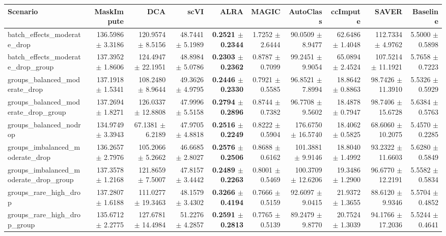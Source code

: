 \begin{tabular}{@{}lrrrrrrrrr@{}}
\toprule
Scenario & MaskImpute & DCA & scVI & ALRA & MAGIC & AutoClass & ccImpute & SAVER & Baseline \\
\midrule
batch\_effects\_moderate\_drop & 136.5986 $\pm$ 3.3186 & 120.9574 $\pm$ 8.5156 & 48.7441 $\pm$ 5.1989 & \textbf{0.2521 $\pm$ 0.2344} & 1.7252 $\pm$ 2.6444 & 90.0509 $\pm$ 8.9477 & 62.6486 $\pm$ 1.4048 & 112.7334 $\pm$ 4.9762 & 5.5000 $\pm$ 0.5898 \\
batch\_effects\_moderate\_drop\_group & 137.3952 $\pm$ 1.8606 & 124.4947 $\pm$ 22.1951 & 48.8984 $\pm$ 5.0786 & \textbf{0.2303 $\pm$ 0.2362} & 0.8787 $\pm$ 0.7099 & 99.2451 $\pm$ 9.9054 & 65.0894 $\pm$ 2.4524 & 107.5214 $\pm$ 11.1921 & 5.7658 $\pm$ 0.7223 \\
groups\_balanced\_moderate\_drop & 137.1918 $\pm$ 1.5341 & 108.2480 $\pm$ 8.9644 & 49.3626 $\pm$ 4.9795 & \textbf{0.2446 $\pm$ 0.2330} & 0.7921 $\pm$ 0.5585 & 96.8521 $\pm$ 7.8994 & 18.8642 $\pm$ 0.8863 & 98.7426 $\pm$ 11.3910 & 5.5326 $\pm$ 0.5929 \\
groups\_balanced\_moderate\_drop\_group & 137.2694 $\pm$ 1.8271 & 126.0337 $\pm$ 12.8808 & 47.9996 $\pm$ 5.5158 & \textbf{0.2794 $\pm$ 0.2896} & 0.8744 $\pm$ 0.7382 & 96.7708 $\pm$ 9.5602 & 18.4878 $\pm$ 0.7947 & 98.7406 $\pm$ 15.6728 & 5.6384 $\pm$ 0.5763 \\
groups\_balanced\_nodrop & 134.9749 $\pm$ 3.3943 & 67.1381 $\pm$ 6.2189 & 47.9705 $\pm$ 4.8818 & \textbf{0.2516 $\pm$ 0.2249} & 0.8222 $\pm$ 0.5904 & 176.6750 $\pm$ 16.5740 & 18.4062 $\pm$ 0.5825 & 68.6060 $\pm$ 10.2075 & 5.4570 $\pm$ 0.2285 \\
groups\_imbalanced\_moderate\_drop & 136.2657 $\pm$ 2.7976 & 105.2066 $\pm$ 5.2662 & 46.6685 $\pm$ 2.8027 & \textbf{0.2576 $\pm$ 0.2506} & 0.8688 $\pm$ 0.6162 & 101.3881 $\pm$ 9.9146 & 18.8040 $\pm$ 1.4992 & 93.2322 $\pm$ 11.6603 & 5.6280 $\pm$ 0.5849 \\
groups\_imbalanced\_moderate\_drop\_group & 137.3578 $\pm$ 1.2168 & 121.8659 $\pm$ 7.5007 & 47.8157 $\pm$ 3.4442 & \textbf{0.2489 $\pm$ 0.2263} & 0.8001 $\pm$ 0.5469 & 100.3709 $\pm$ 12.6206 & 19.3486 $\pm$ 1.2900 & 96.6770 $\pm$ 12.2191 & 5.5582 $\pm$ 0.5834 \\
groups\_rare\_high\_drop & 137.2807 $\pm$ 1.6188 & 111.0277 $\pm$ 19.3463 & 48.1579 $\pm$ 3.4302 & \textbf{0.3266 $\pm$ 0.4194} & 0.7666 $\pm$ 0.5159 & 92.6097 $\pm$ 9.0415 & 21.9372 $\pm$ 1.3655 & 88.6120 $\pm$ 9.9346 & 5.5704 $\pm$ 0.4852 \\
groups\_rare\_high\_drop\_group & 135.6712 $\pm$ 2.2775 & 127.6781 $\pm$ 14.4984 & 51.2276 $\pm$ 4.2857 & \textbf{0.2591 $\pm$ 0.2813} & 0.7765 $\pm$ 0.5139 & 89.2479 $\pm$ 9.8770 & 20.7524 $\pm$ 1.3039 & 94.1766 $\pm$ 17.2036 & 5.5244 $\pm$ 0.4641 \\

\end{tabular}
